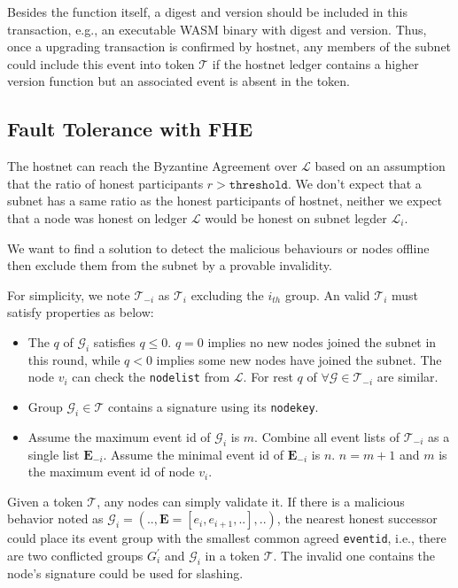 \documentclass[11pt]{article}
\begin{document}
Besides the function itself, a digest and version should be included in this transaction, e.g., an executable WASM binary with digest and version.
Thus, once a upgrading transaction is confirmed by hostnet, any members of the subnet could include this event into token $\mathcal{T}$ if the hostnet ledger contains a higher version function but an associated event is absent in the token.

\subsection{Fault Tolerance with FHE}
\label{sec:fault_tolerance}
The hostnet can reach the Byzantine Agreement over $\mathcal{L}$ based on an assumption that the ratio of honest participants $r > \texttt{threshold}$.
We don{'}t expect that a subnet has a same ratio as the honest participants of hostnet, neither we expect that a node was honest on ledger $\mathcal{L}$ would be honest on subnet legder $\mathcal{L}_{i}$.

We want to find a solution to detect the malicious behaviours or nodes offline then exclude them from the subnet by a provable invalidity.

For simplicity, we note $\mathcal{T}_{-i}$ as $\mathcal{T}_{i}$ excluding the $i_{th}$ group. An valid $\mathcal{T}_{i}$ must satisfy properties as below:

\begin{itemize}
\item The $q$ of $\mathcal{G}_{i}$ satisfies \(q \leq 0\). $q=0$ implies no new nodes joined the subnet in this round, while $q < 0$ implies some new nodes have joined the subnet. The node $v_{i}$ can check the \texttt{nodelist} from $\mathcal{L}$.
For rest $q$ of $\forall \mathcal{G} \in \mathcal{T}_{-i}$ are similar.
\item Group $\mathcal{G}_{i} \in \mathcal{T}$ contains a signature using its \texttt{nodekey}.
\item Assume the maximum event id of $\mathcal{G}_{i}$ is $m$. Combine all event lists of $\mathcal{T}_{-i}$ as a single list $\mathbf{E}_{-i}$. Assume the minimal event id of $\mathbf{E}_{-i}$ is $n$.
\(n = m+1\) and $m$ is the maximum event id of node $v_{i}$.
\end{itemize}

Given a token $\mathcal{T}$, any nodes can simply validate it.
If there is a malicious behavior noted as \( \mathcal{G}_{i} = (.., \mathbf{E} = [e_{i}, e_{i+1}, ..], ..) \), the nearest honest successor could place its event group with the smallest common agreed \texttt{eventid}, i.e., there are two conflicted groups $G_{i}^{\prime}$ and $\mathcal{G}_{i}$ in a token $\mathcal{T}$.
The invalid one contains the node's signature could be used for slashing.
\end{document}
